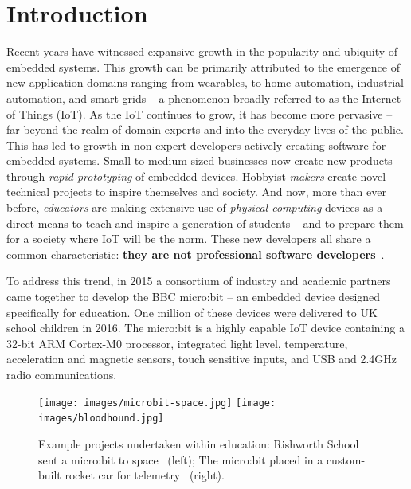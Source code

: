 \section{Introduction}
\label{sec:intro}

Recent years have witnessed expansive growth in the popularity and ubiquity of embedded systems. This growth can be primarily attributed to the emergence of new application domains ranging from wearables, to home automation, industrial automation, and smart grids -- a phenomenon broadly referred to as the Internet of Things (IoT). As the IoT continues to grow, it has become more pervasive -- far beyond the realm of domain experts and into the everyday lives of the public. This has led to growth in non-expert developers actively creating software for embedded systems. Small to medium sized businesses now create new products through \emph{rapid prototyping} of embedded devices. Hobbyist \emph{makers} create novel technical projects to inspire themselves and society. And now, more than ever before, \emph{educators} are making extensive use of \emph{physical computing} devices as a direct means to teach and inspire a generation of students -- and to prepare them for a society where IoT will be the norm. These new developers all share a common characteristic: \textbf{they are not professional software developers}~\cite{dougherty2012maker,bruce2015make,maksimovic2014raspberry}.

To address this trend, in 2015 a consortium of industry and academic partners came together to develop the BBC micro:bit -- an embedded device designed specifically for education. One million of these devices were delivered to UK school children in 2016. The micro:bit is a highly capable IoT device containing a 32-bit ARM Cortex-M0 processor, integrated light level, temperature, acceleration and magnetic sensors, touch sensitive inputs, and USB and 2.4GHz radio communications.

\begin{figure}[t]
    \centering
    \texttt{[image: images/microbit-space.jpg]}
    \texttt{[image: images/bloodhound.jpg]}
    \setlength{\belowcaptionskip}{-10pt}
    \caption{\label{fig:projects} Example projects undertaken within education: Rishworth School sent a micro:bit to space~\cite{microbit79:online} (left); The micro:bit placed in a custom-built rocket car for telemetry~\cite{microbit73:online, microsoft:online} (right).}
    \vspace{-5pt}
\end{figure}

